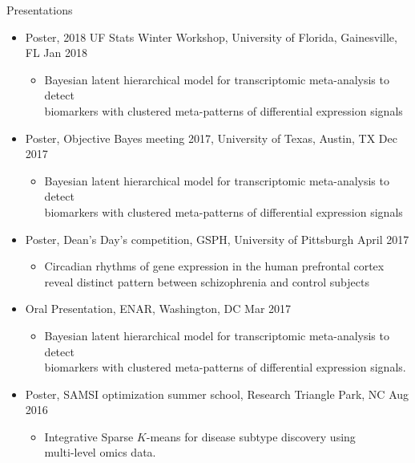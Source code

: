 \documentclass{resume} %
\begin{document}
\begin{rSection}{Presentations}
\begin{itemize}[noitemsep,topsep=0pt]
\item  Poster, 2018 UF Stats Winter Workshop, University of Florida, Gainesville, FL \hfill {Jan 2018}
\begin{itemize}[noitemsep,topsep=0pt]
\item{Bayesian latent hierarchical model for transcriptomic meta-analysis to detect\\ biomarkers with clustered meta-patterns of differential expression signals}
\end{itemize}

\item  Poster, Objective Bayes meeting 2017, University of Texas, Austin, TX \hfill {Dec 2017}
\begin{itemize}[noitemsep,topsep=0pt]
\item{Bayesian latent hierarchical model for transcriptomic meta-analysis to detect\\ biomarkers with clustered meta-patterns of differential expression signals}
\end{itemize}

\item  Poster, Dean's Day's competition, GSPH, University of Pittsburgh \hfill {April 2017}
\begin{itemize}[noitemsep,topsep=0pt]
\item{Circadian rhythms of gene expression in the human prefrontal cortex \\reveal distinct pattern between schizophrenia and control subjects}
\end{itemize}

\item Oral Presentation, ENAR, Washington, DC \hfill {Mar 2017}
\begin{itemize}[noitemsep,topsep=0pt]
\item{Bayesian latent hierarchical model for transcriptomic meta-analysis to detect\\ biomarkers with clustered meta-patterns of differential expression signals.}
\end{itemize}




\item Poster, SAMSI optimization summer school,  Research Triangle Park, NC  \hfill {Aug 2016}
\begin{itemize}[noitemsep,topsep=0pt]
\item{Integrative Sparse $K$-means for disease subtype discovery using \\multi-level omics data.}
\end{itemize}


\end{itemize}
\end{rSection}
\end{document}
